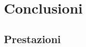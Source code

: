 \documentclass[../main.tex]{subfiles}
\begin{document}
\chapter{Conclusioni}
\section{Prestazioni}
\end{document}
